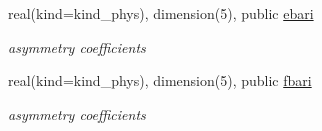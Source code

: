 \begin{Indent}
\begin{DoxyCompactItemize}
real(kind=kind\+\_\+phys), dimension(5), public \hyperlink{namespacemodule__radsw__cldprtb_a3cc7ab844ca564bd3df02a687bbc2f43}{ebari}
\begin{DoxyCompactList}\small\item\em asymmetry coefficients \end{DoxyCompactList}\item 
\mbox{\label{namespacemodule__radsw__cldprtb_ac2e5b61aea6effe7d49586bf5223c154}} 
real(kind=kind\+\_\+phys), dimension(5), public \hyperlink{namespacemodule__radsw__cldprtb_ac2e5b61aea6effe7d49586bf5223c154}{fbari}
\begin{DoxyCompactList}\small\item\em asymmetry coefficients \end{DoxyCompactList}\end{DoxyCompactItemize}
\end{Indent}
